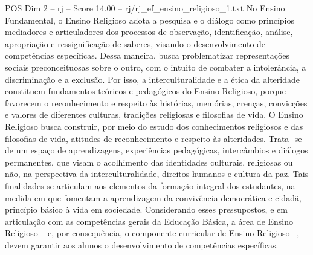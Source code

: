 \begin{textsample}{POS Dim 2 – rj – Score 14.00 – rj/rj\_ef\_ensino\_religioso\_1.txt}
No Ensino Fundamental, o Ensino Religioso adota a pesquisa e o diálogo como princípios mediadores e articuladores dos processos de observação, identificação, análise, apropriação e ressignificação de saberes, visando o desenvolvimento de competências específicas.
Dessa maneira, busca problematizar representações sociais preconceituosas sobre o outro, com o intuito de combater a intolerância, a discriminação e a exclusão.
Por isso, a interculturalidade e a ética da alteridade constituem fundamentos teóricos e pedagógicos do Ensino Religioso, porque favorecem o reconhecimento e respeito às histórias, memórias, crenças, convicções e valores de diferentes culturas, tradições religiosas e filosofias de vida.
O Ensino Religioso busca construir, por meio do estudo dos conhecimentos religiosos e das filosofias de vida, atitudes de reconhecimento e respeito às alteridades.
Trata -se de um espaço de aprendizagens, experiências pedagógicas, intercâmbios e diálogos permanentes, que visam o acolhimento das identidades culturais, religiosas ou não, na perspectiva da interculturalidade, direitos humanos e cultura da paz.
Tais finalidades se articulam aos elementos da formação integral dos estudantes, na medida em que fomentam a aprendizagem da convivência democrática e cidadã, princípio básico à vida em sociedade.
Considerando esses pressupostos, e em articulação com as competências gerais da Educação Básica, a área de Ensino Religioso – e, por consequência, o componente curricular de Ensino Religioso –, devem garantir aos alunos o desenvolvimento de competências específicas.

\end{textsample}
